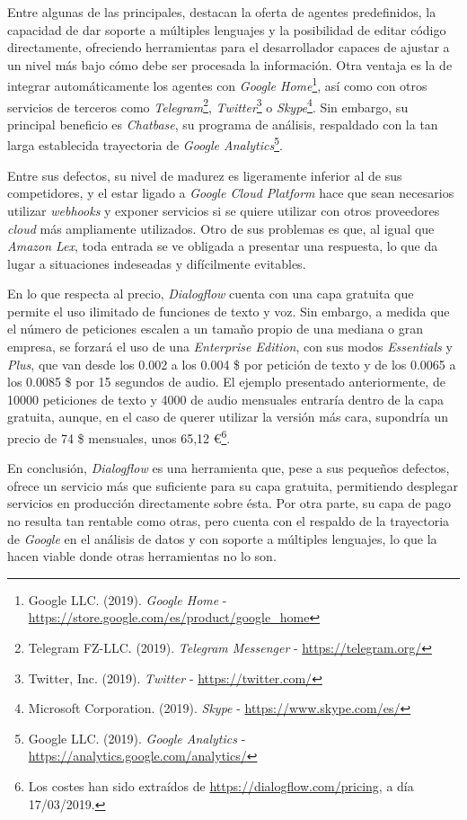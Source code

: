 \documentclass[11pt,spanish,listoffigures]{tfgetsinf}
\begin{document}
Entre algunas de las principales, destacan la oferta de agentes predefinidos, la capacidad de dar soporte a múltiples lenguajes y la posibilidad de editar código directamente, ofreciendo herramientas para el desarrollador capaces de ajustar a un nivel más bajo cómo debe ser procesada la información. Otra ventaja es la de integrar automáticamente los agentes con \textit{Google Home}\footnote{Google LLC. (2019). \textit{Google Home} - \url{https://store.google.com/es/product/google_home}}, así como con otros servicios de terceros como \textit{Telegram}\footnote{Telegram FZ-LLC. (2019). \textit{Telegram Messenger} - \url{https://telegram.org/}}, \textit{Twitter}\footnote{Twitter, Inc. (2019). \textit{Twitter} - \url{https://twitter.com/}} o \textit{Skype}\footnote{Microsoft Corporation. (2019). \textit{Skype} - \url{https://www.skype.com/es/}}. Sin embargo, su principal beneficio es \textit{Chatbase}, su programa de análisis, respaldado con la tan larga establecida trayectoria de \textit{Google Analytics}\footnote{Google LLC. (2019). \textit{Google Analytics} - \url{https://analytics.google.com/analytics/}}.

Entre sus defectos, su nivel de madurez es ligeramente inferior al de sus competidores, y el estar ligado a \textit{Google Cloud Platform} hace que sean necesarios utilizar \textit{\gls{webhook}s} y exponer servicios si se quiere utilizar con otros proveedores \textit{cloud} más ampliamente utilizados. Otro de sus problemas es que, al igual que \textit{Amazon Lex}, toda entrada se ve obligada a presentar una respuesta, lo que da lugar a situaciones indeseadas y difícilmente evitables.

En lo que respecta al precio, \textit{Dialogflow} cuenta con una capa gratuita que permite el uso ilimitado de funciones de texto y voz. Sin embargo, a medida que el número de peticiones escalen a un tamaño propio de una mediana o gran empresa, se forzará el uso de una \textit{Enterprise Edition}, con sus modos \textit{Essentials} y \textit{Plus}, que van desde los 0.002 a los 0.004 \$ por petición de texto y de los 0.0065 a los 0.0085 \$ por 15 segundos de audio. El ejemplo presentado anteriormente, de 10000 peticiones de texto y 4000 de audio mensuales entraría dentro de la capa gratuita, aunque, en el caso de querer utilizar la versión más cara, supondría un precio de 74 \$ mensuales, unos 65,12 \euro\footnote{Los costes han sido extraídos de \url{https://dialogflow.com/pricing}, a día 17/03/2019.}.

En conclusión, \textit{Dialogflow} es una herramienta que, pese a sus pequeños defectos, ofrece un servicio más que suficiente para su capa gratuita, permitiendo desplegar servicios en producción directamente sobre ésta. Por otra parte, su capa de pago no resulta tan rentable como otras, pero cuenta con el respaldo de la trayectoria de \textit{Google} en el análisis de datos y con soporte a múltiples lenguajes, lo que la hacen viable donde otras herramientas no lo son.
\end{document}
